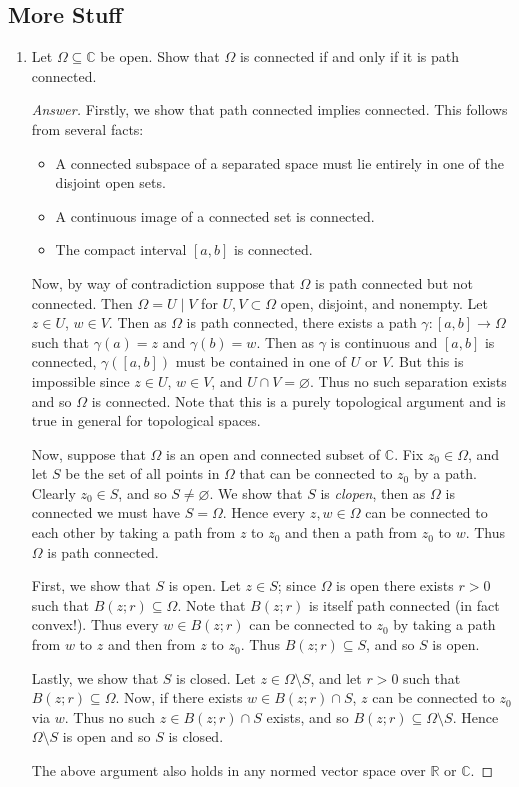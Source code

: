 \documentclass[12pt]{article}
\newcommand{\cx}{\mathbb{C}}
\newcommand{\real}{\mathbb{R}}
\newcommand{\ita}[1]{\textit{#1}}
\newcommand\paren[1]{\left( #1 \right)}
\theoremstyle{definition}
\begin{document}
\subsection{More Stuff}
\begin{enumerate}
    \item Let $\Omega \subseteq \cx$ be open. Show that $\Omega$ is connected if and only if it is path connected.
    \begin{proof}[Answer]
        Firstly, we show that path connected implies connected. This follows from several facts:
        \begin{itemize}
            \item A connected subspace of a separated space must lie entirely in one of the disjoint open sets.
            \item A continuous image of a connected set is connected.
            \item The compact interval $[a,b]$ is connected.
        \end{itemize}
        Now, by way of contradiction suppose that $\Omega$ is path connected but not connected. Then $\Omega = U \mid V$ for $U , V \subset \Omega$ open, disjoint, and nonempty. Let $z \in U$, $w \in V$. Then as $\Omega$ is path connected, there exists a path $\gamma : [a,b] \to \Omega$ such that $\gamma(a) = z$ and $\gamma(b) = w$. Then as $\gamma$ is continuous and $[a,b]$ is connected, $\gamma \paren{ [a,b] }$ must be contained in one of $U$ or $V$. But this is impossible since $z \in U$, $w \in V$, and $U \cap V = \varnothing$. Thus no such separation exists and so $\Omega$ is connected. Note that this is a purely topological argument and is true in general for topological spaces.
        
        Now, suppose that $\Omega$ is an open and connected subset of $\cx$. Fix $z_0 \in \Omega$, and let $S$ be the set of all points in $\Omega$ that can be connected to $z_0$ by a path. Clearly $z_0 \in S$, and so $S \neq \varnothing$. We show that $S$ is \ita{clopen}, then as $\Omega$ is connected we must have $S = \Omega$. Hence every $z,w \in \Omega$ can be connected to each other by taking a path from $z$ to $z_0$ and then a path from $z_0$ to $w$. Thus $\Omega$ is path connected.
        
        First, we show that $S$ is open. Let $z \in S$; since $\Omega$ is open there exists $r > 0$ such that $B(z;r) \subseteq \Omega$. Note that $B(z;r)$ is itself path connected (in fact convex!). Thus every $w \in B(z;r)$ can be connected to $z_0$ by taking a path from $w$ to $z$ and then from $z$ to $z_0$. Thus $B(z;r) \subseteq S$, and so $S$ is open.
        
        Lastly, we show that $S$ is closed. Let $z \in \Omega \setminus S$, and let $r > 0$ such that $B(z;r) \subseteq \Omega$. Now, if there exists $w \in B(z;r) \cap S$, $z$ can be connected to $z_0$ via $w$. Thus no such $z \in B(z;r) \cap S$ exists, and so $B(z;r) \subseteq \Omega \setminus S$. Hence $\Omega \setminus S$ is open and so $S$ is closed.
        
        The above argument also holds in any normed vector space over $\real$ or $\cx$.
    \end{proof}
\end{enumerate}
\end{document}
